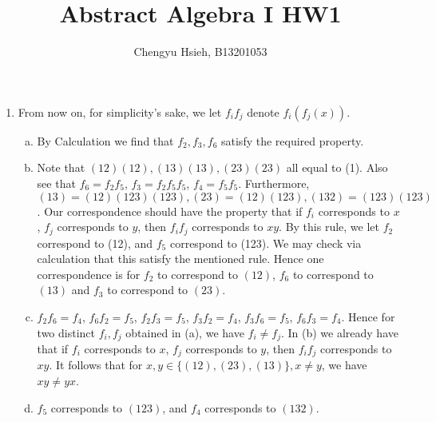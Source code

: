 \documentclass[A4paper,12pt]{article}
\title{Abstract Algebra I HW1}
\author{Chengyu Hsieh, B13201053}
\date{}
\theoremstyle{definition}
\numberwithin{equation}{section}
\begin{document}
\maketitle
\begin{enumerate}[1)]
    \item
            From now on, for simplicity's sake, we let $f_{i}f_{j}$ denote $f_{i}(f_{j}(x))$.
        \begin{enumerate}[(a)]
            \item
                By Calculation we find that $f_{2}, f_{3}, f_{6}$ satisfy the required property.
            \item
                Note that $(12)(12), (13)(13), (23)(23)$ all equal to (1). Also see that $f_{6} = f_{2}f_{5}$, $f_{3} = f_{2}f_{5}f_{5}$, $f_{4} = f_{5}f_{5}$. Furthermore, $(13)=(12)(123)(123), (23)=(12)(123), (132)=(123)(123)$.
                Our correspondence should have the property that if $f_{i}$ corresponds to $x$, $f_{j}$ corresponds to $y$, then $f_{i}f_{j}$ corresponds to $xy$.
                By this rule, we let $f_{2}$ correspond to (12), and $f_{5}$ correspond to (123). We may check via calculation that this satisfy the mentioned rule.
                Hence one correspondence is for $f_{2}$ to correspond to $(12)$, $f_{6}$ to correspond to $(13)$ and $f_{3}$ to correspond to $(23)$. 
            \item
                $f_{2}f_{6}  = f_{4}$, $f_{6}f_{2} = f_{5}$, $f_{2}f_{3} = f_{5}$, $f_{3}f_{2} = f_{4}$, $f_{3}f_{6} = f_{5}$, $f_{6}f_{3} = f_{4}$. Hence for two distinct $f_{i}, f_{j}$ obtained in (a), we have $f_{i} \neq f_{j}$.
                In (b) we already have that if $f_{i}$ corresponds to $x$, $f_{j}$ corresponds to $y$, then $f_{i}f_{j}$ corresponds to $xy$.
                It follows that for $x, y \in \{(12), (23), (13)\}, x \neq y$, we have $xy \neq yx$.


            \item
                $f_{5}$ corresponds to $(123)$, and $f_{4}$ corresponds to $(132)$.


\end{enumerate}
\end{enumerate}
\end{document}
